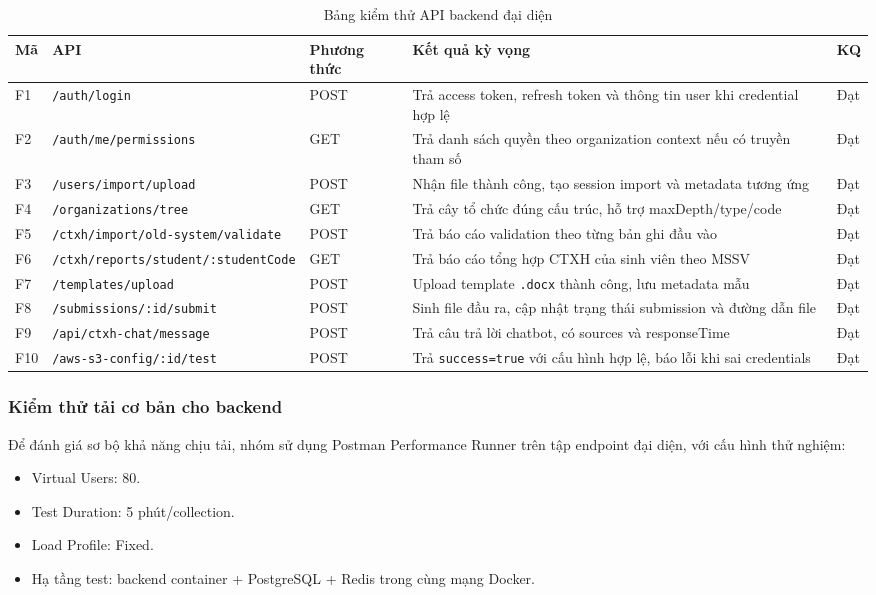 \begin{table}[H]
\centering
\renewcommand{\arraystretch}{1.2}
\small
\begin{tabular}{|p{2.0cm}|p{3.8cm}|p{2.5cm}|p{5.0cm}|p{1.4cm}|}
\hline
\textbf{Mã} & \textbf{API} & \textbf{Phương thức} & \textbf{Kết quả kỳ vọng} & \textbf{KQ} \\
\hline
F1 & \texttt{/auth/login} & POST & Trả access token, refresh token và thông tin user khi credential hợp lệ & Đạt \\
\hline
F2 & \texttt{/auth/me/permissions} & GET & Trả danh sách quyền theo organization context nếu có truyền tham số & Đạt \\
\hline
F3 & \texttt{/users/import/upload} & POST & Nhận file thành công, tạo session import và metadata tương ứng & Đạt \\
\hline
F4 & \texttt{/organizations/tree} & GET & Trả cây tổ chức đúng cấu trúc, hỗ trợ maxDepth/type/code & Đạt \\
\hline
F5 & \texttt{/ctxh/import/old-system/validate} & POST & Trả báo cáo validation theo từng bản ghi đầu vào & Đạt \\
\hline
F6 & \texttt{/ctxh/reports/student/:studentCode} & GET & Trả báo cáo tổng hợp CTXH của sinh viên theo MSSV & Đạt \\
\hline
F7 & \texttt{/templates/upload} & POST & Upload template \texttt{.docx} thành công, lưu metadata mẫu & Đạt \\
\hline
F8 & \texttt{/submissions/:id/submit} & POST & Sinh file đầu ra, cập nhật trạng thái submission và đường dẫn file & Đạt \\
\hline
F9 & \texttt{/api/ctxh-chat/message} & POST & Trả câu trả lời chatbot, có sources và responseTime & Đạt \\
\hline
F10 & \texttt{/aws-s3-config/:id/test} & POST & Trả \texttt{success=true} với cấu hình hợp lệ, báo lỗi khi sai credentials & Đạt \\
\hline
\end{tabular}
\caption{Bảng kiểm thử API backend đại diện}
\end{table}

\subsubsection{Kiểm thử tải cơ bản cho backend}
Để đánh giá sơ bộ khả năng chịu tải, nhóm sử dụng Postman Performance Runner trên tập endpoint đại diện, với cấu hình thử nghiệm:
\begin{itemize}
	\item Virtual Users: 80.
	\item Test Duration: 5 phút/collection.
	\item Load Profile: Fixed.
	\item Hạ tầng test: backend container + PostgreSQL + Redis trong cùng mạng Docker.
\end{itemize}

